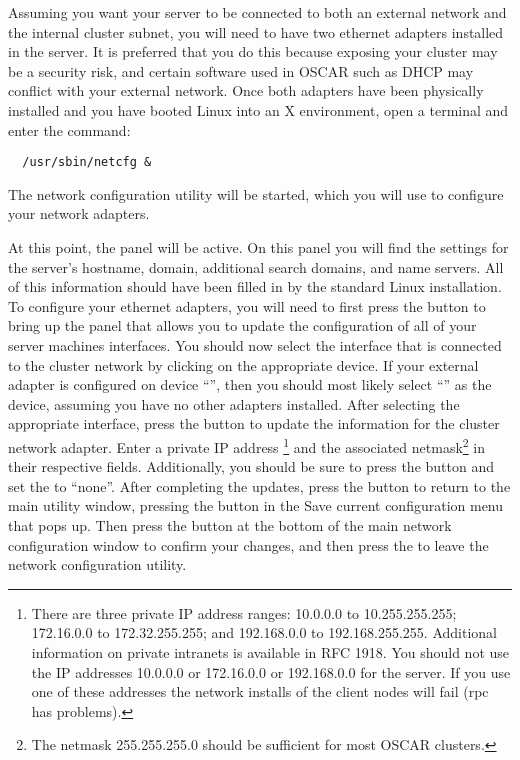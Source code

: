 Assuming you want your server to be connected to both an external
network and the internal cluster subnet, you will need to have two
ethernet adapters installed in the server. It is preferred that you do
this because exposing your cluster may be a security risk, and certain
software used in OSCAR such as DHCP may conflict with your external
network.  Once both adapters have been physically installed and you
have booted Linux into an X environment, open a terminal and enter the
command:

\begin{verbatim}
  /usr/sbin/netcfg &
\end{verbatim}
  
The network configuration utility will be started, which you will use
to configure your network adapters.
  
At this point, the  panel will be active. On this panel
you will find the settings for the server's hostname, domain,
additional search domains, and name servers. All of this information
should have been filled in by the standard Linux installation. To
configure your ethernet adapters, you will need to first press the
 button to bring up the panel that allows you to
update the configuration of all of your server machines interfaces.
You should now select the interface that is connected to the cluster
network by clicking on the appropriate device. If your external
adapter is configured on device ``'', then you should most
likely select ``'' as the device, assuming you have no
other adapters installed. After selecting the appropriate interface,
press the  button to update the information for the
cluster network adapter. Enter a private IP address
\begchange
\footnote
{
  There are
  three private IP address ranges: 10.0.0.0 to 10.255.255.255;
  172.16.0.0 to 172.32.255.255; and 192.168.0.0 to 192.168.255.255.
  Additional information on private intranets is available in RFC
  1918.
  You should not use the IP addresses 10.0.0.0 or 172.16.0.0 or 
  192.168.0.0 for the server.  If you use one of these addresses 
  the network installs of the client nodes will fail (rpc has 
  problems).
}
\endchange
and the associated netmask\footnote{The netmask
  255.255.255.0 should be sufficient for most OSCAR clusters.}  in
their respective fields. Additionally, you should be sure to press the
 button and set the
 to ``none''.  After
completing the updates, press the  button to return to
the main utility window,
\begchange
pressing the  button in the Save current configuration
menu that pops up.
\endchange
Then press the  button at the bottom of the main network
configuration window to confirm your changes, and then press the
 to leave the network configuration utility.
  
